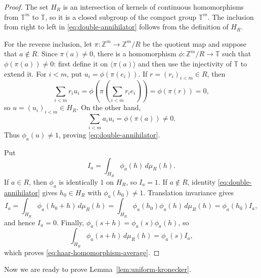 \documentclass[10pt,a4paper]{amsart}
\newcommand{\T}{\mathbb T}
\newcommand{\Z}{\mathbb Z}
\begin{document}
\begin{proof}
The set $H_R$ is an intersection of kernels of continuous homomorphisms
from $\T^m$ to $\T$, so it is a closed subgroup of the compact group
$\T^m$.  The inclusion from right to left in
\eqref{eq:double-annihilator} follows from the definition of $H_R$.

For the reverse inclusion, let $\pi:\Z^m\to\Z^m/R$ be the quotient map and
suppose that $a\notin R$.  Since $\pi(a)\neq0$, there is a homomorphism
$\phi:\Z^m/R\to\T$ such that $\phi(\pi(a))\neq0$: first define it on
$\langle\pi(a)\rangle$ and then use the injectivity of $\T$ to extend it.
For $i<m$, put $u_i=\phi(\pi(e_i))$.  If $r=(r_i)_{i<m}\in R$, then
\[
 \sum_{i<m}r_i u_i
 =\phi\left(\pi\left(\sum_{i<m}r_i e_i\right)\right)
 =\phi(\pi(r))=0,
\]
so $u=(u_i)_{i<m}\in H_R$.  On the other hand,
\[
 \sum_{i<m}a_i u_i=\phi(\pi(a))\neq0.
\]
Thus $\phi_a(u)\neq1$, proving \eqref{eq:double-annihilator}.

Put
\[
 I_a=\int_{H_R}\phi_a(h)\,d\mu_R(h).
\]
If $a\in R$, then $\phi_a$ is identically $1$ on $H_R$, so $I_a=1$.  If
$a\notin R$, identity \eqref{eq:double-annihilator} gives
$h_0\in H_R$ with $\phi_a(h_0)\neq1$.  Translation invariance gives
\[
 I_a=\int_{H_R}\phi_a(h_0+h)\,d\mu_R(h)=\int_{H_R}\phi_a(h_0)\phi_a(h)\,d\mu_R(h)=\phi_a(h_0)I_a,
\]
and hence $I_a=0$.  Finally,
$\phi_a(s+h)=\phi_a(s)\phi_a(h)$, so
\[
  \int_{H_R}\phi_a(s+h)\,d\mu_R(h)=\phi_a(s)I_a,
\]
which proves \eqref{eq:haar-homomorphism-average}.
\end{proof}

Now we are ready to prove Lemma~\ref{lem:uniform-kronecker}.
\end{document}
